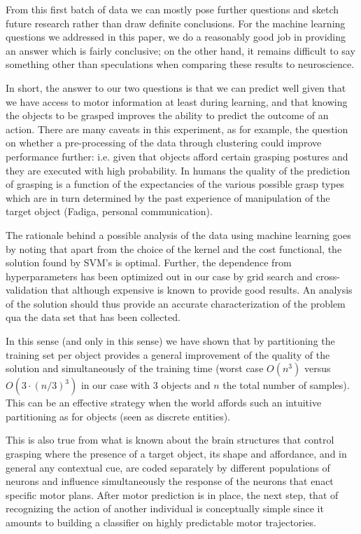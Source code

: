 From this first batch of data we can mostly pose further questions and
sketch future research rather than draw definite conclusions. For
the machine learning questions we addressed in this paper, we do a 
reasonably good job in providing an answer which is fairly conclusive;
on the other hand, it remains difficult to say something other than 
speculations when comparing these results to neuroscience.

In short, the answer to our two questions is that we can predict well 
given that we have access to motor information at least during learning, 
and that knowing the objects to be grasped improves the ability to
predict the outcome of an action. There are many caveats in this 
experiment, as for example, the question on whether a pre-processing
of the data through clustering could improve performance further: i.e.
given that objects afford certain grasping postures and they are 
executed with high probability. In humans the quality of the prediction
of grasping is a function of the expectancies of the various possible 
grasp types which are in turn determined by the past experience of 
manipulation of the target object (Fadiga, personal communication).

The rationale behind a possible analysis of the data using machine 
learning goes by noting that apart from the choice of the kernel and 
the cost functional, the solution found by SVM's is optimal. Further,
the dependence from hyperparameters has been optimized out in our case
by grid search and cross-validation that although expensive is known
to provide good results. An analysis of the solution should thus provide 
an accurate characterization of the problem qua the data set that has
been collected. 

In this sense (and only in this sense) we have shown that by partitioning
the training set per object provides a general improvement of the quality
of the solution and simultaneously of the training time (worst case $O(n^3)$ 
versus $O(3 \cdot (n/3)^3)$ in our case with $3$ objects and $n$ the total 
number of samples). This can be an effective strategy when the world 
affords such an intuitive partitioning as for objects (seen as discrete
entities).

This is also true from what is known about the brain structures that
control grasping where the presence of a target object, its shape and 
affordance, and in general any contextual cue, are coded separately by 
different populations of neurons and influence simultaneously the 
response of the neurons that enact specific motor plans. After motor
prediction is in place, the next step, that of recognizing the action
of another individual is conceptually simple since it amounts to 
building a classifier on highly predictable motor trajectories.


